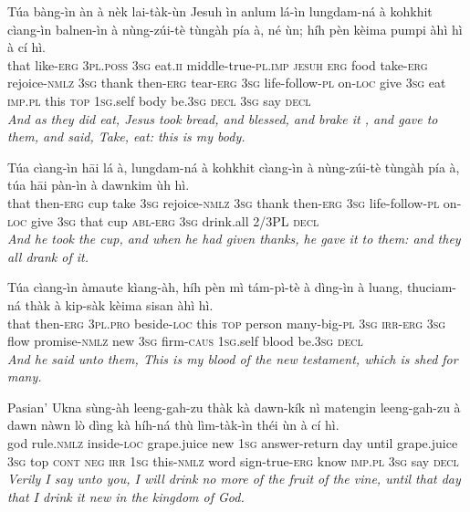 \documentclass[11pt,a4paper]{article}
\begin{document}
\begin{exe}
\gll Túa bàng-ìn àn à nèk lai-tàk-ùn Jesuh ìn anlum lá-ìn lungdam-ná à kohkhit cìang-ìn balnen-ìn à nùng-zúi-tè tùngàh pía à, né ùn; híh pèn kèima pumpi àhì hì à cí hì. \\
     that like-\textsc{erg} \textsc{3pl}.\textsc{poss} \textsc{3sg} eat.\textsc{ii} middle-true-\textsc{pl}.\textsc{imp} \textsc{jesuh} \textsc{erg} food take-\textsc{erg} rejoice-\textsc{nmlz} \textsc{3sg} thank then-\textsc{erg} tear-\textsc{erg} \textsc{3sg} life-follow-\textsc{pl} on-\textsc{loc} give \textsc{3sg} eat \textsc{imp}.\textsc{pl} this \textsc{top} \textsc{1sg}.self body be.\textsc{3sg} \textsc{decl} \textsc{3sg} say \textsc{decl} \\
\glt \textcolor{kjvcolor}{\textit{And as they did eat, Jesus took bread, and blessed, and brake it , and gave to them, and said, Take, eat: this is my body.}}

\gll Túa cìang-ìn hāi lá à, lungdam-ná à kohkhit cìang-ìn à nùng-zúi-tè tùngàh pía à, túa hāi pàn-ìn à dawnkim ùh hì. \\
     that then-\textsc{erg} cup take \textsc{3sg} rejoice-\textsc{nmlz} \textsc{3sg} thank then-\textsc{erg} \textsc{3sg} life-follow-\textsc{pl} on-\textsc{loc} give \textsc{3sg} that cup \textsc{abl}-\textsc{erg} \textsc{3sg} drink.all 2/3PL \textsc{decl} \\
\glt \textcolor{kjvcolor}{\textit{And he took the cup, and when he had given thanks, he gave it to them: and they all drank of it.}}

\gll Túa cìang-ìn àmaute kìang-àh, híh pèn mì tám-pì-tè à dìng-ìn à luang, thuciam-ná thàk à kip-sàk kèima sisan àhì hì. \\
     that then-\textsc{erg} \textsc{3pl}.\textsc{pro} beside-\textsc{loc} this \textsc{top} person many-big-\textsc{pl} \textsc{3sg} \textsc{irr}-\textsc{erg} \textsc{3sg} flow promise-\textsc{nmlz} new \textsc{3sg} firm-\textsc{caus} \textsc{1sg}.self blood be.\textsc{3sg} \textsc{decl} \\
\glt \textcolor{kjvcolor}{\textit{And he said unto them, This is my blood of the new testament, which is shed for many.}}

\gll Pasian' Ukna sùng-àh leeng-gah-zu thàk kà dawn-kík nì matengin leeng-gah-zu à dawn nàwn lò dìng kà híh-ná thù lìm-tàk-ìn théi ùn à cí hì. \\
     god rule.\textsc{nmlz} inside-\textsc{loc} grape.juice new \textsc{1sg} answer-return day until grape.juice \textsc{3sg} top \textsc{cont} \textsc{neg} \textsc{irr} \textsc{1sg} this-\textsc{nmlz} word sign-true-\textsc{erg} know \textsc{imp}.\textsc{pl} \textsc{3sg} say \textsc{decl} \\
\glt \textcolor{kjvcolor}{\textit{Verily I say unto you, I will drink no more of the fruit of the vine, until that day that I drink it new in the kingdom of God.}}


\end{exe}
\end{document}
